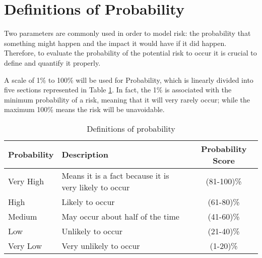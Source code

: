 \section{Definitions of Probability}
\label{3.1}
Two parameters are commonly used in order to model risk: the probability that something might happen and the impact it would have if it did happen. Therefore, to evaluate the probability of the potential risk to occur it is crucial to define and quantify it properly. 

A scale of 1\% to 100\% will be used for Probability, which is linearly divided into five sections represented in Table \ref{definitionsofprobability}. In fact, the 1\% is associated with the minimum probability of a risk, meaning that it will very rarely occur; while the maximum 100\% means the risk will be unavoidable.

\begin{table}[H]
	\centering
	\begin{tabular}{l >{\raggedright\arraybackslash}p{7.8cm} c}
		
		\toprule[2pt]
		
		\textbf{Probability} &  \textbf{Description}  & \textbf{Probability Score}\\
		
		\midrule [1.5pt]
		
		Very High & Means it is a fact because it is very likely to occur & (81-100)\% \vspace{0.2cm} \\
		
		\midrule
		
		High & Likely to occur & (61-80)\% \vspace{0.2cm} \\
		
		\midrule
		
		Medium & May occur about half of the time & (41-60)\% \vspace{0.2cm} \\
	
		\midrule
	
		Low & Unlikely to occur & (21-40)\% \vspace{0.2cm} \\
	
		\midrule
	
		Very Low & Very unlikely to occur & (1-20)\% \vspace{0.2cm} \\
			
		\bottomrule[2pt]

	\end{tabular}
	\caption{Definitions of probability}
	\label{definitionsofprobability}
\end{table}